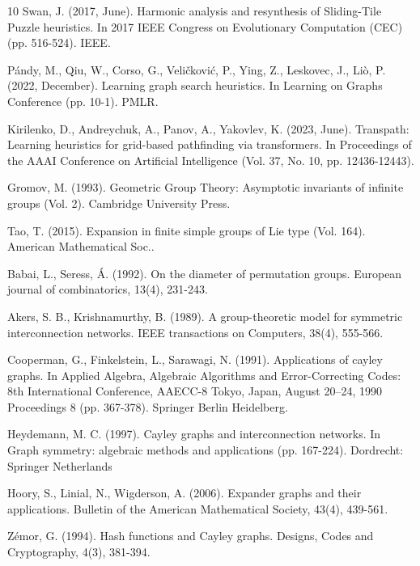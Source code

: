 \documentclass[reqno,11pt]{amsart}
\begin{document}
\begin{thebibliography}{10}
Swan, J. (2017, June). Harmonic analysis and resynthesis of Sliding-Tile Puzzle heuristics. In 2017 IEEE Congress on Evolutionary Computation (CEC) (pp. 516-524). IEEE.


Pándy, M., Qiu, W., Corso, G., Veličković, P., Ying, Z., Leskovec, J.,  Liò, P. (2022, December). Learning graph search heuristics. In Learning on Graphs Conference (pp. 10-1). PMLR.

Kirilenko, D., Andreychuk, A., Panov, A.,  Yakovlev, K. (2023, June). Transpath: Learning heuristics for grid-based pathfinding via transformers. In Proceedings of the AAAI Conference on Artificial Intelligence (Vol. 37, No. 10, pp. 12436-12443).

Gromov, M. (1993). Geometric Group Theory: Asymptotic invariants of infinite groups (Vol. 2). Cambridge University Press.

Tao, T. (2015). Expansion in finite simple groups of Lie type (Vol. 164). American Mathematical Soc..

Babai, L.,  Seress, Á. (1992). On the diameter of permutation groups. European journal of combinatorics, 13(4), 231-243.

Akers, S. B., Krishnamurthy, B. (1989). A group-theoretic model for symmetric interconnection networks. IEEE transactions on Computers, 38(4), 555-566.

Cooperman, G., Finkelstein, L.,  Sarawagi, N. (1991). Applications of cayley graphs. In Applied Algebra, Algebraic Algorithms and Error-Correcting Codes: 8th International Conference, AAECC-8 Tokyo, Japan, August 20–24, 1990 Proceedings 8 (pp. 367-378). Springer Berlin Heidelberg.

Heydemann, M. C. (1997). Cayley graphs and interconnection networks. In Graph symmetry: algebraic methods and applications (pp. 167-224). Dordrecht: Springer Netherlands

Hoory, S., Linial, N.,  Wigderson, A. (2006). Expander graphs and their applications. Bulletin of the American Mathematical Society, 43(4), 439-561.

Zémor, G. (1994). Hash functions and Cayley graphs. Designs, Codes and Cryptography, 4(3), 381-394.


\end{thebibliography}
\end{document}
